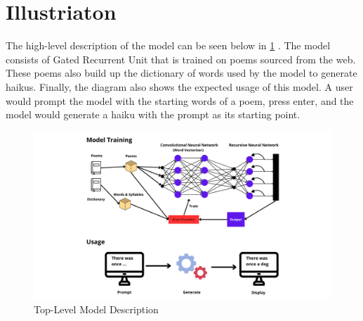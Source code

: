 \documentclass{article} %
\begin{document}
\section{Illustriaton}
The high-level description of the model can be seen below in \ref{fig:model_diagram} .
The model consists of Gated Recurrent Unit that is trained on poems sourced from the web.
These poems also build up the dictionary of words used by the model to generate haikus.
Finally, the diagram also shows the expected usage of this model.
A user would prompt the model with the starting words of a poem, press enter,
and the model would generate a haiku with the prompt as its starting point.



\begin{figure}[h]
  \begin{center}
  \includegraphics[width=1\textwidth]{Figs/model_diagram.png}
  \end{center}
  \caption{Top-Level Model Description}
  \label{fig:model_diagram}
\end{figure}
\end{document}
